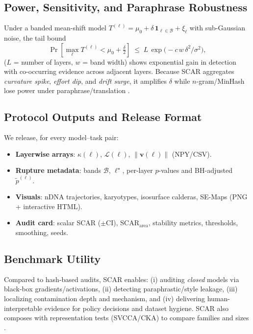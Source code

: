 \documentclass[11pt]{article}
\begin{document}
\subsection*{Power, Sensitivity, and Paraphrase Robustness}
\label{subsec:power}
Under a banded mean-shift model $T^{(\ell)}=\mu_0+\delta\,\mathbf{1}_{\ell\in\mathcal{B}}+\xi_\ell$ with sub-Gaussian noise, the tail bound
\[
\Pr\!\left[\max_\ell T^{(\ell)}<\mu_0+\tfrac{\delta}{2}\right]
\;\le\;
L\,\exp\!\big(-c\,w\,\delta^2/\sigma^2\big),
\]
($L$ = number of layers, $w$ = band width) shows exponential gain in detection with co-occurring evidence across adjacent layers. Because SCAR aggregates \emph{curvature spike}, \emph{effort dip}, and \emph{drift surge}, it amplifies $\delta$ while $n$-gram/MinHash lose power under paraphrase/translation \citep{ribeiro2020checklist,iyyer2018scpn,broder1997minhash}.

\subsection*{Protocol Outputs and Release Format}
\label{subsec:release}
We release, for every model–task pair:
\begin{itemize}
    \item \textbf{Layerwise arrays}: $\kappa(\ell)$, $\mathcal{L}(\ell)$, $\|\mathbf{v}(\ell)\|$ (NPY/CSV).
    \item \textbf{Rupture metadata}: bands $\mathcal{B}$, $\ell^\star$, per-layer $p$-values and BH-adjusted $\tilde p^{(\ell)}$.
    \item \textbf{Visuals}: nDNA trajectories, karyotypes, isosurface calderas, SE-Maps (PNG + interactive HTML).
    \item \textbf{Audit card}: scalar SCAR ($\pm$CI), SCAR$_{\mathrm{area}}$, stability metrics, thresholds, smoothing, seeds.
\end{itemize}

\subsection*{Benchmark Utility}
\label{subsec:utility}
Compared to hash-based audits, SCAR enables: (i) auditing \emph{closed} models via black-box gradients/activations, (ii) detecting paraphrastic/style leakage, (iii) localizing contamination depth and mechanism, and (iv) delivering human-interpretable evidence for policy decisions and dataset hygiene. SCAR also composes with representation tests (SVCCA/CKA) to compare families and sizes \citep{raghu2017svcca,kornblith2019cka}.
\end{document}
